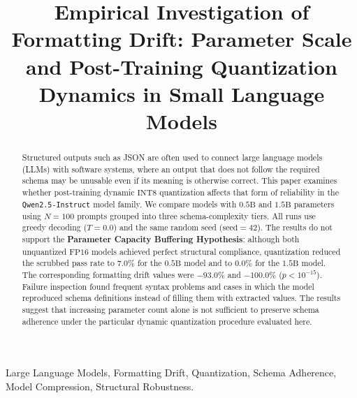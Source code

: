 \documentclass[10pt, conference, a4paper]{IEEEtran}
\begin{document}
\title{Empirical Investigation of Formatting Drift: Parameter Scale and Post-Training Quantization Dynamics in Small Language Models}

\author{
}

\maketitle

\begin{abstract}
Structured outputs such as JSON are often used to connect large language models (LLMs) with software systems, where an output that does not follow the required schema may be unusable even if its meaning is otherwise correct. This paper examines whether post-training dynamic $\text{INT8}$ quantization affects that form of reliability in the \texttt{Qwen2.5-Instruct} model family. We compare models with $0.5\text{B}$ and $1.5\text{B}$ parameters using $N=100$ prompts grouped into three schema-complexity tiers. All runs use greedy decoding ($T=0.0$) and the same random seed ($\text{seed}=42$). The results do not support the \textbf{Parameter Capacity Buffering Hypothesis}: although both unquantized $\text{FP16}$ models achieved perfect structural compliance, quantization reduced the scrubbed pass rate to $7.0\%$ for the $0.5\text{B}$ model and to $0.0\%$ for the $1.5\text{B}$ model. The corresponding formatting drift values were $-93.0\%$ and $-100.0\%$ ($p < 10^{-15}$). Failure inspection found frequent syntax problems and cases in which the model reproduced schema definitions instead of filling them with extracted values. The results suggest that increasing parameter count alone is not sufficient to preserve schema adherence under the particular dynamic quantization procedure evaluated here.
\end{abstract}

\begin{IEEEkeywords}
Large Language Models, Formatting Drift, Quantization, Schema Adherence, Model Compression, Structural Robustness.
\end{IEEEkeywords}

\end{document}
